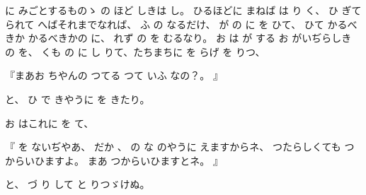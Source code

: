 に
みごとするものゝ
の
ほど
しきは
し。
ひるほどに
まねば
は
り
く、
ひ
ぎて
られて
へばそれまでなれば、
ふ
の
なるだけ、
が
の
に
を
ひて、
ひて
かるべきか
かるべきかの
に、
れず
の
を
むるなり。
お
は
が
する
お
がいぢらしき
の
を、
くも
の
に
し
りて、たちまちに
を
らげ
を
りつ、

『まあお
ちやんの
つてる
つて
いふ
なの？。
』

と、
ひ
で
きやうに
を
きたり。

お
はこれに
を
て、

『
を
ないぢやあ、
だか
、
の
な
のやうに
えますからネ、
つたらしくても
つからいひますよ。
まあ
つからいひますとネ。
』

と、
づ
り
して
と
りつゞけぬ。

